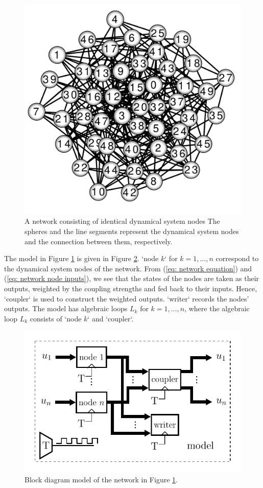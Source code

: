 \documentclass{juliacon}
\begin{document}
\begin{figure}
    \centering
    \includegraphics[width=0.5\linewidth]{figures/Networks/wattz_strogatz.pdf}    
    \caption{A network consisting of identical dynamical system nodes The spheres and the line segments represent the dynamical system nodes and the connection between them, respectively.}
    \label{fig: network graph}
\end{figure}

The model in Figure \ref{fig: network graph} is given in Figure \ref{fig: network model}. `node $k$` for $k =1, \ldots, n$ correspond to the dynamical system nodes of the network.  From (\ref{eq: network equation}) and (\ref{eq: network node inputs}), we see that the states of the nodes are taken as their outputs, weighted by the coupling strengths and fed back to their inputs. Hence, `coupler` is used to construct the weighted outputs. `writer` records the nodes' outputs. The model has algebraic loops $L_k$ for $k = 1, \ldots, n$, where the algebraic loop $L_k$ consists of `node $k$` and `coupler`. 

\begin{figure}
    \centering
    \includegraphics[width=0.8\linewidth]{figures/NetworkModel-WattzStrogatz/network_wattz_strogratz.pdf}
    \caption{Block diagram model of the network in Figure \ref{fig: network graph}.}
    \label{fig: network model}
\end{figure}
\end{document}
